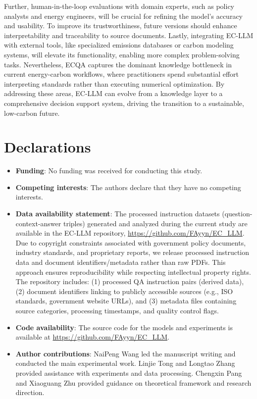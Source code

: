 \documentclass[]{interact}
\theoremstyle{plain}%
\theoremstyle{definition}
\theoremstyle{remark}
\begin{document}
Further, human-in-the-loop evaluations with domain experts, such as policy analysts and energy engineers, will be crucial for refining the model's accuracy and usability. To improve its trustworthiness, future versions should enhance interpretability and traceability to source documents. Lastly, integrating EC-LLM with external tools, like specialized emissions databases or carbon modeling systems, will elevate its functionality, enabling more complex problem-solving tasks. Nevertheless, ECQA captures the dominant knowledge bottleneck in current energy-carbon workflows, where practitioners spend substantial effort interpreting standards rather than executing numerical optimization. By addressing these areas, EC-LLM can evolve from a knowledge layer to a comprehensive decision support system, driving the transition to a sustainable, low-carbon future.




\relax

\section*{Declarations}

\begin{itemize}
\item \textbf{Funding}: No funding was received for conducting this study.
\item \textbf{Competing interests}: The authors declare that they have no competing interests.
\item \textbf{Data availability statement}: The processed instruction datasets (question-context-answer triples) generated and analyzed during the current study are available in the EC-LLM repository, \url{https://github.com/FAyyn/EC\_LLM}. Due to copyright constraints associated with government policy documents, industry standards, and proprietary reports, we release processed instruction data and document identifiers/metadata rather than raw PDFs. This approach ensures reproducibility while respecting intellectual property rights. The repository includes: (1) processed QA instruction pairs (derived data), (2) document identifiers linking to publicly accessible sources (e.g., ISO standards, government website URLs), and (3) metadata files containing source categories, processing timestamps, and quality control flags.
\item \textbf{Code availability}: The source code for the models and experiments is available at \url{https://github.com/FAyyn/EC\_LLM}.
\item \textbf{Author contributions}: NaiPeng Wang led the manuscript writing and conducted the main experimental work. Linjie Tong and Longtao Zhang provided assistance with experiments and data processing. Chengxin Pang and Xiaoguang Zhu provided guidance on theoretical framework and research direction.
\end{itemize} 
\end{document}
